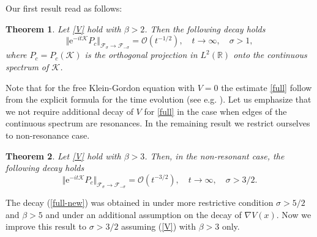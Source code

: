 \documentclass[reqno]{amsart}
\newtheorem{theorem}{Theorem}[section]
\newcommand{\R}{{\mathbb R}}
\newcommand{\cF}{{\mathcal F}}
\newcommand{\cK}{{\mathcal K}}
\newcommand{\E}{\mathrm{e}}
\numberwithin{equation}{section}
\begin{document}
Our first result read as follows:
\begin{theorem}\label{Main}
Let \eqref{V} hold with $\beta>2$. Then the following decay holds
\begin{equation}\label{full}
\Vert \E^{-it\cK}P_c\Vert_{{\cF}_{\sigma}\to {\cF}_{-\sigma}}=\mathcal{O}(t^{-1/2}),\quad t\to\infty,\quad\sigma>1,
\end{equation}
where $P_c=P_c(\cK)$ is the orthogonal projection in
$L^2(\R)$ onto the continuous spectrum of $\cK$.
\end{theorem}
Note that for the free Klein-Gordon  equation 
with $V=0$ the estimate \eqref{full} follow  from the explicit formula for the time evolution (see e.g. \cite{KK}).
Let us emphasize that we not require additional decay of $V$ for \eqref{full} in the case when edges of the continuous spectrum are resonances.
In the remaining result we restrict ourselves to non-resonance case.
\begin{theorem}\label{Main-new}
Let \eqref{V} hold with $\beta>3$. Then, in the non-resonant case, the following decay holds
\begin{equation}\label{full-new}
\Vert \E^{-it\cK}P_c\Vert_{{\cF}_{\sigma}\to {\cF}_{-\sigma}}=\mathcal{O}(t^{-3/2}),\quad t\to\infty,\quad \sigma>3/2.
\end{equation}
\end{theorem}
The  decay (\ref{full-new}) was obtained in \cite {KK,K10}
under more restrictive condition  $\sigma>5/2$ and $\beta>5$ and under an additional assumption on the decay of $\nabla V(x)$. 
Now we improve this result to $\sigma>3/2$ assuming  (\ref{V}) with $\beta>3$ only.
\end{document}
